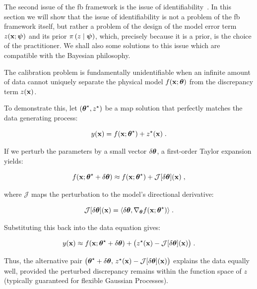 The second issue of the \gls{fb} framework is the issue of identifiability~\cite{Gramacy2015}. In this section we will show that the issue of identifiability is not a problem of the \gls{fb} framework itself, but rather a problem of the design of the model error term $z(\mathbf{x}; \boldsymbol{\psi})$ and its prior $\pi \left( z \mid \boldsymbol{\psi}\right)$, which, precisely because it is a prior, is the choice of the practitioner. We shall also  some solutions to this issue which are compatible with the Bayesian philosophy.

The calibration problem is fundamentally unidentifiable when an infinite amount of data cannot uniquely separate the physical model $f(\mathbf{x}; \boldsymbol{\theta})$ from the discrepancy term $z(\mathbf{x})$. 

\smallskip
To demonstrate this, let $(\boldsymbol{\theta}^\star, z^\star)$ be a \gls{map} solution that perfectly matches the data generating process:

\begin{equation}
y(\mathbf{x}) = f(\mathbf{x}; \boldsymbol{\theta}^\star) + z^\star(\mathbf{x}) \;.
\end{equation}

If we perturb the parameters by a small vector $\delta\boldsymbol{\theta}$, a first-order Taylor expansion yields:

\begin{equation}
f(\mathbf{x}; \boldsymbol{\theta}^\star + \delta\boldsymbol{\theta}) \approx f(\mathbf{x}; \boldsymbol{\theta}^\star) + \mathcal{J}[\delta \boldsymbol{\theta}](\mathbf{x}) \;,
\end{equation}

where $\mathcal{J}$ maps the perturbation to the model's directional derivative:

\begin{equation}
\mathcal{J}[\delta \boldsymbol{\theta}](\mathbf{x}) = \langle \delta\boldsymbol{\theta}, \nabla_{\boldsymbol{\theta}}f(\mathbf{x}; \boldsymbol{\theta}^\star) \rangle \;.
\end{equation}

Substituting this back into the data equation gives:

\begin{equation}
y(\mathbf{x}) \approx f(\mathbf{x}; \boldsymbol{\theta}^\star + \delta\boldsymbol{\theta}) + \big(z^\star(\mathbf{x}) - \mathcal{J}[\delta \boldsymbol{\theta}](\mathbf{x})\big)\;.
\end{equation}

Thus, the alternative pair $\big(\boldsymbol{\theta}^\star + \delta\boldsymbol{\theta}, \, z^\star(\mathbf{x}) - \mathcal{J}[\delta \boldsymbol{\theta}](\mathbf{x})\big)$ explains the data equally well, provided the perturbed discrepancy remains within the function space of $z$ (typically guaranteed for flexible Gaussian Processes).

